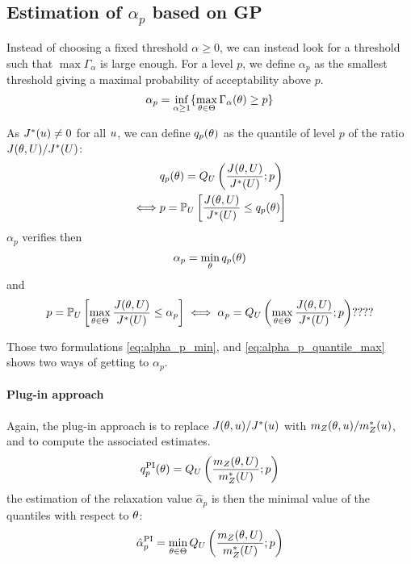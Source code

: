 \documentclass[../../Main_ManuscritThese.tex]{subfiles}
\begin{document}
\subsection{Estimation of $\alpha_p$ based on GP}
Instead of choosing a fixed threshold $\alpha \geq 0$, we can instead look for a threshold such that $\max \Gamma_{\alpha}$ is large enough.
For a level $p$, we define $\alpha_p$ as the smallest threshold giving a maximal probability of acceptability above $p$.
\begin{equation}
  \alpha_p = \inf_{\alpha \geq 1}\{\max_{\theta \in \Theta}\Gamma_{\alpha}(\theta)\geq p \}
\end{equation}

As $J^*(u) \neq 0$ for all $u$, we can define $q_{p}(\theta)$ as the quantile of level $p$ of the ratio $J(\theta, U) / J^*(U)$:
\begin{align}
       & q_{p}(\theta) = Q_{U}\left(\frac{J(\theta, U)}{J^*(U)};p\right) \\
  \iff &p          = \mathbb{P}_{U}\left[\frac{J(\theta, U)}{J^*(U)} \leq q_{p}(\theta)\right]
\end{align}
$\alpha_p$ verifies then
\begin{equation}
  \label{eq:alpha_p_min}
\alpha_p = \min_{\theta} q_p(\theta)
\end{equation}
and 
\begin{equation}
  \label{eq:alpha_p_quantile_max}
  p = \mathbb{P}_{U}\left[\max_{\theta \in \Theta}\frac{J(\theta, U)}{J^*(U)} \leq \alpha_p\right] \iff \alpha_p = Q_{U}\left(\max_{\theta\in\Theta} \frac{J(\theta,U)}{J^*(U)};p\right)
  ????
\end{equation}

Those two formulations \cref{eq:alpha_p_min}, and \cref{eq:alpha_p_quantile_max} shows two ways of getting to $\alpha_p$.
\paragraph{Plug-in approach}
Again, the plug-in approach is to replace $J(\theta, u)/J^*(u)$ with $m_Z(\theta, u) / m^*_Z(u)$, and to compute the associated estimates.
\begin{equation}
  q_{p}^{\mathrm{PI}}(\theta) = Q_{U}\left(\frac{m_Z(\theta, U)}{m^*_Z(U)};p\right)
\end{equation}
the estimation of the relaxation value $\hat{\alpha}_p$ is then the minimal value of the quantiles with respect to $\theta$:
\begin{equation}
    \label{eq:def_plugin_alpha}
  \hat{\alpha}^{\mathrm{PI}}_p = \min_{\kk \in \Kspace} Q_U\left(\frac{m_Z(\kk, \UU)}{m^*_Z(\UU)};p\right) %
\end{equation}
\end{document}
